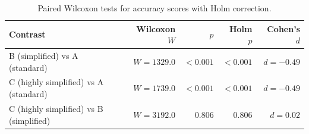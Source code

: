 \begin{table}[H]
\caption{Paired Wilcoxon tests for accuracy scores with Holm correction.}
\label{tab:accuracy:pairwise}
\centering
\begin{tabular}{lrrrr}
\toprule
Contrast & Wilcoxon $W$ & $p$ & Holm $p$ & Cohen's $d$ \\
\midrule
B (simplified) vs A (standard) & $W = 1329.0$ & $<0.001$ & $<0.001$ & $d = -0.49$ \\
C (highly simplified) vs A (standard) & $W = 1739.0$ & $<0.001$ & $<0.001$ & $d = -0.49$ \\
C (highly simplified) vs B (simplified) & $W = 3192.0$ & 0.806 & 0.806 & $d = 0.02$ \\
\bottomrule
\end{tabular}
\end{table}
